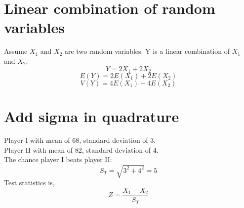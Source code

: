 \documentclass{article}
\begin{document}
\section{Linear combination of random variables}
Assume $X_1$ and $X_2$ are two random variables. Y is a linear combination of $X_1$ and $X_2$.\\
\[Y = 2X_1+2X_2\]
\[E(Y)=2E(X_1)+2E(X_2)\]
\[V(Y)=4E(X_1)+4E(X_2)\]
\section{Add sigma in quadrature}
Player I with mean of 68, standard deviation of 3.\\
Player II with mean of 82, standard deviation of 4.\\
The chance player I beats player II:
\[S_T = \sqrt{3^2+4^2}=5\]
Test statistics is,
\[Z=\frac{X_1-X_2}{S_T}\]
\end{document}
